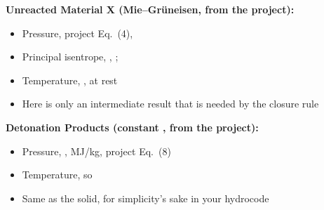 \documentclass[11pt,addpoints]{exam}
\begin{document}
\begin{tcolorbox}[breakable]
\textbf{Unreacted Material X (Mie--Gr\"uneisen, from the project):}\vspace{.5em}
\begin{itemize}
\item Pressure, \hspace{3mm}  \hspace{5mm} project Eq.~(4), \vspace{1.0em}
\item Principal isentrope, \hspace{3mm} , \hspace{2mm} ; \hspace{5mm} \vspace{1.0em}
\item Temperature, \hspace{3mm}  \hspace{5mm} ,  at rest\vspace{.5em}
\item Here  is only an intermediate result that is needed by the closure rule
\end{itemize}
\end{tcolorbox}


\begin{tcolorbox}[breakable]
\textbf{Detonation Products (constant \bm{$\gamma$}, from the project):}\vspace{.5em}
\begin{itemize}
\item Pressure, \hspace{3mm}  \hspace{5mm} , \hspace{2mm}  MJ/kg, \hspace{2mm} project Eq.~(8)\vspace{1.0em}
\item Temperature, \hspace{3mm}  \hspace{5mm} so \hspace{3mm} \vspace{1.0em} 
\item Same  as the solid, for simplicity's sake in your hydrocode
\end{itemize}
\end{tcolorbox}
\end{document}

